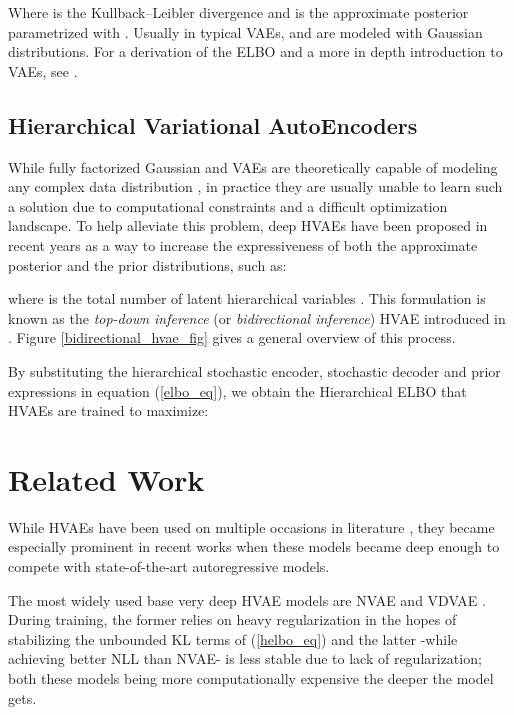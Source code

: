 \documentclass{article}
\begin{document}
Where  is the Kullback–Leibler divergence and  is the approximate posterior parametrized with . Usually in typical VAEs,  and  are modeled with Gaussian distributions. For a derivation of the ELBO and a more in depth introduction to VAEs, see \cite{kingma2019vae_tutorial}.


\subsection{Hierarchical Variational AutoEncoders}

While fully factorized Gaussian  and  VAEs are theoretically capable of modeling any complex data distribution , in practice they are usually unable to learn such a solution due to computational constraints and a difficult optimization landscape\cite{yu2020frombayestoit}. To help alleviate this problem, deep HVAEs \cite{ranganath2016hierarchical, NIPS2016_ddeebdee, sonderby2016ladder, klushyn2019learning} have been proposed in recent years as a way to increase the expressiveness of both the approximate posterior and the prior distributions, such as:





where  is the total number of latent hierarchical variables . This formulation is known as the \textit{top-down inference} (or \textit{bidirectional inference}) HVAE introduced in \cite{sonderby2016ladder}. Figure \ref{bidirectional_hvae_fig} gives a general overview of this process.

By substituting the hierarchical stochastic encoder, stochastic decoder and prior expressions in equation (\ref{elbo_eq}), we obtain the Hierarchical ELBO that HVAEs are trained to maximize:



\section{Related Work}
\label{related_work}
While HVAEs have been used on multiple occasions in literature \cite{ranganath2016hierarchical, sonderby2016ladder, klushyn2019learning}, they became especially prominent in recent works when these models became deep enough to compete with state-of-the-art autoregressive models. 

The most widely used base very deep HVAE models are NVAE \cite{vahdat2020nvae} and VDVAE \cite{child2021very}. During training, the former relies on heavy regularization in the hopes of stabilizing the unbounded KL terms of (\ref{helbo_eq}) and the latter -while achieving better NLL than NVAE- is less stable due to lack of regularization; both these models being more computationally expensive the deeper the model gets.
\end{document}
